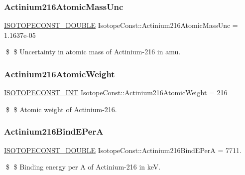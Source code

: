 \subsubsection{\texorpdfstring{Actinium216\+Atomic\+Mass\+Unc}{Actinium216AtomicMassUnc}}
{\footnotesize\ttfamily \mbox{\hyperlink{group___isotope_const-_macros_ga8f45a7272ce02c0b4c65c44636ed719a}{I\+S\+O\+T\+O\+P\+E\+C\+O\+N\+S\+T\+\_\+\+D\+O\+U\+B\+LE}} Isotope\+Const\+::\+Actinium216\+Atomic\+Mass\+Unc = 1.\+1637e-\/05}

\$ \$ Uncertainty in atomic mass of Actinium-\/216 in amu. \mbox{\label{group___isotope_const-_actinium-_ac216_ga646ea47011d7a92fdb21bc4867c590bf}} 
\subsubsection{\texorpdfstring{Actinium216\+Atomic\+Weight}{Actinium216AtomicWeight}}
{\footnotesize\ttfamily \mbox{\hyperlink{group___isotope_const-_macros_ga5f18360b3e99483a35c32d789e62621c}{I\+S\+O\+T\+O\+P\+E\+C\+O\+N\+S\+T\+\_\+\+I\+NT}} Isotope\+Const\+::\+Actinium216\+Atomic\+Weight = 216}

\$ \$ Atomic weight of Actinium-\/216. \mbox{\label{group___isotope_const-_actinium-_ac216_ga461852ec63fa67aa6681cfb489bc232c}} 
\subsubsection{\texorpdfstring{Actinium216\+Bind\+E\+PerA}{Actinium216BindEPerA}}
{\footnotesize\ttfamily \mbox{\hyperlink{group___isotope_const-_macros_ga8f45a7272ce02c0b4c65c44636ed719a}{I\+S\+O\+T\+O\+P\+E\+C\+O\+N\+S\+T\+\_\+\+D\+O\+U\+B\+LE}} Isotope\+Const\+::\+Actinium216\+Bind\+E\+PerA = 7711.}

\$ \$ Binding energy per A of Actinium-\/216 in keV. \mbox{\label{group___isotope_const-_actinium-_ac216_ga21a16760d5a938cd34e69f96d34a4146}} 
